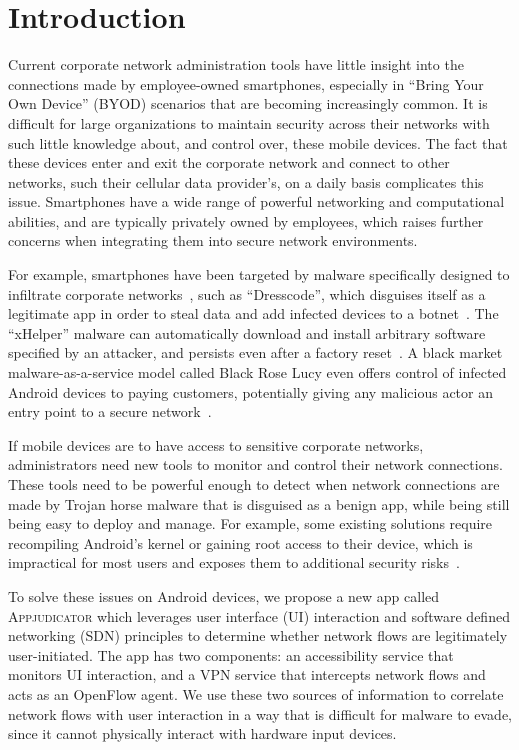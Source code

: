 \section{Introduction}
\label{sec:introduction}


Current corporate network administration tools have little insight into the connections made by employee-owned smartphones, especially in ``Bring Your Own Device'' (BYOD) scenarios that are becoming increasingly common. It is difficult for large organizations to maintain security across their networks with such little knowledge about, and control over, these mobile devices. The fact that these devices enter and exit the corporate network and connect to other networks, such their cellular data provider's, on a daily basis complicates this issue. Smartphones have a wide range of powerful networking and computational abilities, and are typically privately owned by employees, which raises further concerns when integrating them into secure network environments.

For example, smartphones have been targeted by malware specifically designed to infiltrate corporate networks~\cite{kan2016}, such as ``Dresscode'', which disguises itself as a legitimate app in order to steal data and add infected devices to a botnet~\cite{palmer2016}. The ``xHelper'' malware can automatically download and install arbitrary software specified by an attacker, and persists even after a factory reset~\cite{vijayan2020}. A black market malware-as-a-service model called Black Rose Lucy even offers control of infected Android devices to paying customers, potentially giving any malicious actor an entry point to a secure network~\cite{wong2018}.

If mobile devices are to have access to sensitive corporate networks, administrators need new tools to monitor and control their network connections. These tools need to be powerful enough to detect when network connections are made by Trojan horse malware that is disguised as a benign app, while being still being easy to deploy and manage. For example, some existing solutions require recompiling Android's kernel or gaining root access to their device, which is impractical for most users and exposes them to additional security risks~\cite{google2020}.


To solve these issues on Android devices, we propose a new app called \textsc{Appjudicator} which leverages user interface (UI) interaction and software defined networking (SDN) principles to determine whether network flows are legitimately user-initiated. The app has two components: an accessibility service that monitors UI interaction, and a VPN service that intercepts network flows and acts as an OpenFlow agent. We use these two sources of information to correlate network flows with user interaction in a way that is difficult for malware to evade, since it cannot physically interact with hardware input devices.

